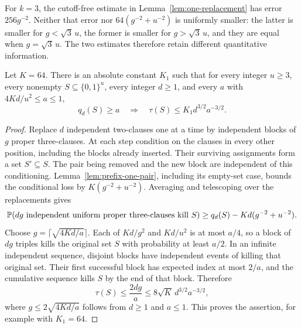 \begin{remark}
For \(k=3\), the cutoff-free estimate in Lemma~\ref{lem:one-replacement}
has error \(256g^{-2}\).  Neither that error nor
\(64(g^{-2}+u^{-2})\) is uniformly smaller: the latter is smaller for
\(g<\sqrt3\,u\), the former is smaller for \(g>\sqrt3\,u\), and they
are equal when \(g=\sqrt3\,u\).  The two estimates therefore retain
different quantitative information.
\end{remark}

\begin{proposition}
\label{prop:prefix-lifetime}
Let \(K=64\).  There is an absolute constant \(K_1\) such that for
every integer \(u\ge3\), every nonempty \(S\subseteq\{0,1\}^u\), every integer
\(d\ge1\), and every \(a\) with \(4Kd/u^2\le a\le1\),
\begin{equation}\label{eq:prefix-lifetime}
 q_d(S)\ge a\quad\Longrightarrow\quad
 \tau(S)\le K_1d^{3/2}a^{-3/2}.
\end{equation}
\end{proposition}

\begin{proof}
Replace \(d\) independent two-clauses one at a time by independent
blocks of \(g\) proper three-clauses.  At each step condition on the
clauses in every other position, including the blocks already inserted.
Their surviving assignments form a set \(S'\subseteq S\).  The pair
being removed and the new block are independent of this conditioning.
Lemma~\ref{lem:prefix-one-pair}, including its empty-set case, bounds
the conditional loss by \(K(g^{-2}+u^{-2})\).  Averaging and telescoping
over the replacements gives
\begin{equation}\label{eq:prefix-many-pairs}
 \mathbb P(\text{\(dg\) independent uniform proper three-clauses kill \(S\)})
 \ge q_d(S)-Kd(g^{-2}+u^{-2}).
\end{equation}
Choose \(g=\lceil\sqrt{4Kd/a}\rceil\).  Each of \(Kd/g^2\) and
\(Kd/u^2\) is at most \(a/4\), so a block of \(dg\) triples kills
the original set \(S\) with probability at least \(a/2\).  In an
infinite independent sequence, disjoint blocks have independent events
of killing that original set.  Their first successful block has expected
index at most \(2/a\), and the cumulative sequence kills \(S\) by
the end of that block.  Therefore
\[
 \tau(S)\le\frac{2dg}{a}\le 8\sqrt K\,d^{3/2}a^{-3/2},
\]
where \(g\le2\sqrt{4Kd/a}\) follows from \(d\ge1\) and \(a\le1\).
This proves the assertion, for example with \(K_1=64\).
\end{proof}


